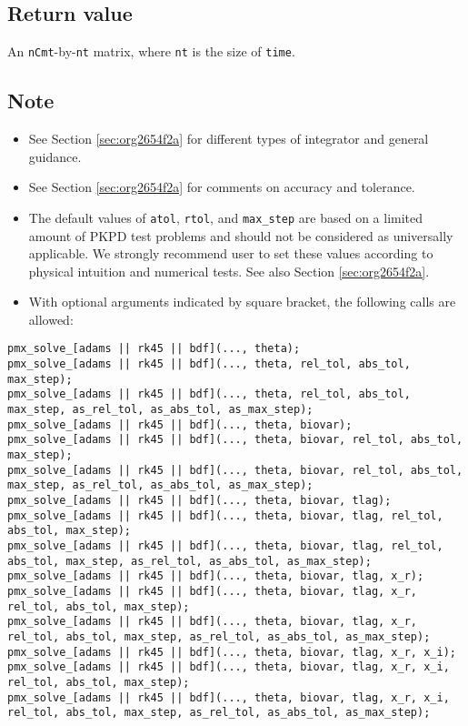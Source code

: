 \documentclass[12pt, reqno, oneside]{amsbook}
\numberwithin{equation}{chapter}
\numberwithin{figure}{chapter}
\numberwithin{table}{chapter}
\theoremstyle{remark}
\begin{document}
\subsection{Return value}
\label{sec:orgab3dea0}
An \texttt{nCmt}-by-\texttt{nt} matrix, where \texttt{nt} is the size of \texttt{time}.
\subsection{Note}
\label{sec:org58a342f}
\begin{itemize}
\item See Section \ref{sec:org2654f2a} for different types of integrator and general guidance.
\item See Section \ref{sec:org2654f2a} for comments on accuracy and tolerance.
\item The default values of \texttt{atol},
\texttt{rtol}, and \texttt{max\_step} are
based on a limited amount of PKPD test problems and should not be considered as
universally applicable. We strongly recommend user to set these values
according to physical intuition and numerical tests. See also Section \ref{sec:org2654f2a}.
\item With optional arguments indicated by square bracket, the following calls are allowed:
\end{itemize}
\begin{verbatim}
pmx_solve_[adams || rk45 || bdf](..., theta);
pmx_solve_[adams || rk45 || bdf](..., theta, rel_tol, abs_tol, max_step);
pmx_solve_[adams || rk45 || bdf](..., theta, rel_tol, abs_tol, max_step, as_rel_tol, as_abs_tol, as_max_step);
pmx_solve_[adams || rk45 || bdf](..., theta, biovar);
pmx_solve_[adams || rk45 || bdf](..., theta, biovar, rel_tol, abs_tol, max_step);
pmx_solve_[adams || rk45 || bdf](..., theta, biovar, rel_tol, abs_tol, max_step, as_rel_tol, as_abs_tol, as_max_step);
pmx_solve_[adams || rk45 || bdf](..., theta, biovar, tlag);
pmx_solve_[adams || rk45 || bdf](..., theta, biovar, tlag, rel_tol, abs_tol, max_step);
pmx_solve_[adams || rk45 || bdf](..., theta, biovar, tlag, rel_tol, abs_tol, max_step, as_rel_tol, as_abs_tol, as_max_step);
pmx_solve_[adams || rk45 || bdf](..., theta, biovar, tlag, x_r);
pmx_solve_[adams || rk45 || bdf](..., theta, biovar, tlag, x_r, rel_tol, abs_tol, max_step);
pmx_solve_[adams || rk45 || bdf](..., theta, biovar, tlag, x_r, rel_tol, abs_tol, max_step, as_rel_tol, as_abs_tol, as_max_step);
pmx_solve_[adams || rk45 || bdf](..., theta, biovar, tlag, x_r, x_i);
pmx_solve_[adams || rk45 || bdf](..., theta, biovar, tlag, x_r, x_i, rel_tol, abs_tol, max_step);
pmx_solve_[adams || rk45 || bdf](..., theta, biovar, tlag, x_r, x_i, rel_tol, abs_tol, max_step, as_rel_tol, as_abs_tol, as_max_step);
\end{verbatim}
\end{document}
